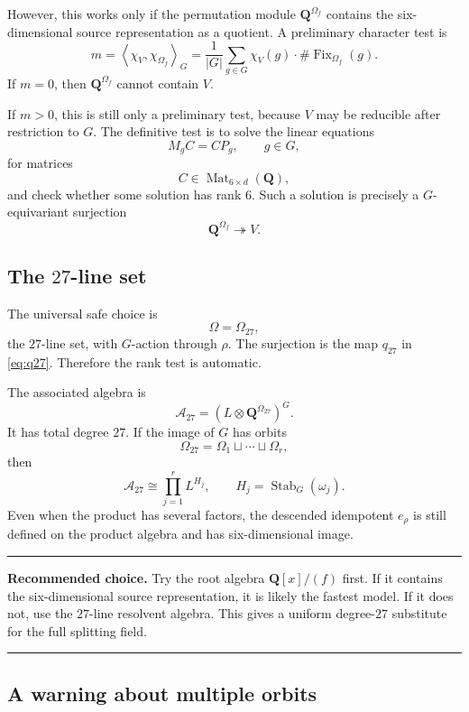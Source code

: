 \documentclass[11pt]{article}
\newcommand{\QQ}{\mathbf{Q}}
\newcommand{\Mat}{\operatorname{Mat}}
\newcommand{\Fix}{\operatorname{Fix}}
\newcommand{\Stab}{\operatorname{Stab}}
\newcommand{\cA}{\mathcal{A}}
\newenvironment{summarybox}{%
  \begin{center}\begin{minipage}{0.94\textwidth}\small
  \hrule\vspace{0.55em}%
}{%
  \vspace{0.55em}\hrule\end{minipage}\end{center}%
}
\begin{document}
However, this works only if the permutation module $\QQ^{\Omega_f}$ contains the
six-dimensional source representation as a quotient.  A preliminary character test
is
\begin{equation}
  m=\left\langle \chi_V,\chi_{\Omega_f}\right\rangle_G
  =\frac{1}{|G|}\sum_{g\in G}\chi_V(g)\cdot\#\Fix_{\Omega_f}(g).
  \label{eq:character-test}
\end{equation}
If $m=0$, then $\QQ^{\Omega_f}$ cannot contain $V$.

If $m>0$, this is still only a preliminary test, because $V$ may be reducible after
restriction to $G$.  The definitive test is to solve the linear equations
\begin{equation}
  M_g C=CP_g,
  \qquad g\in G,
  \label{eq:intertwiner-equations}
\end{equation}
for matrices
\[
  C\in\Mat_{6\times d}(\QQ),
\]
and check whether some solution has rank $6$.  Such a solution is precisely a
$G$-equivariant surjection
\[
  \QQ^{\Omega_f}\twoheadrightarrow V.
\]

\subsection{The $27$-line set}

The universal safe choice is
\[
  \Omega=\Omega_{27},
\]
the $27$-line set, with $G$-action through $\rho$.  The surjection is the map
$q_{27}$ in \eqref{eq:q27}.  Therefore the rank test is automatic.

The associated algebra is
\[
  \cA_{27}=(L\otimes\QQ^{\Omega_{27}})^G.
\]
It has total degree $27$.  If the image of $G$ has orbits
\[
  \Omega_{27}=\Omega_1\sqcup\cdots\sqcup\Omega_r,
\]
then
\[
  \cA_{27}\cong\prod_{j=1}^r L^{H_j},
  \qquad H_j=\Stab_G(\omega_j).
\]
Even when the product has several factors, the descended idempotent $e_\rho$ is
still defined on the product algebra and has six-dimensional image.

\begin{summarybox}
\textbf{Recommended choice.}
Try the root algebra $\QQ[x]/(f)$ first.  If it contains the six-dimensional source
representation, it is likely the fastest model.  If it does not, use the $27$-line
resolvent algebra.  This gives a uniform degree-$27$ substitute for the full
splitting field.
\end{summarybox}

\subsection{A warning about multiple orbits}
\end{document}
